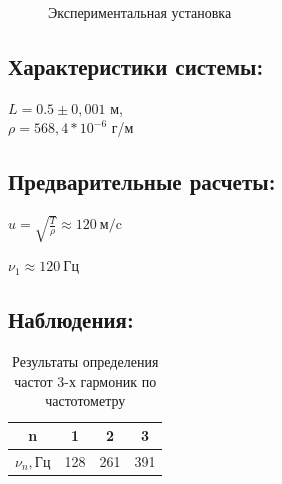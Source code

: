 \documentclass[
a4paper, %
12pt, %
]{article}
\begin{document}
	\begin{figure}[h]
		\caption{Экспериментальная установка}
		\label{experimantal}
	\end{figure}
	
	\newpage
	
	\subsection{Характеристики системы:}
	
	$L = 0.5\pm 0,001$ м,\\
	$\rho = 568,4 * 10^{-6}$ г/м
	
	\subsection{Предварительные расчеты:}
	
	$u = \sqrt{\frac{T}{\rho}} \approx 120 \: \text{м/c}$
	
	$\nu_1 \approx 120 \: \text{Гц}$
	
	\subsection{Наблюдения:}
	
	\begin{table}[h]
		\centering
		\begin{tabular}{|c|c|c|c|}
			\hline
			n & 1 & 2 & 3  \\
			\hline
			$\nu_n, Гц$ & 128 & 261 & 391 \\
			\hline
		\end{tabular}
		\caption{Результаты определения частот 3-х гармоник по частотометру}
	\end{table}
	
\end{document}
